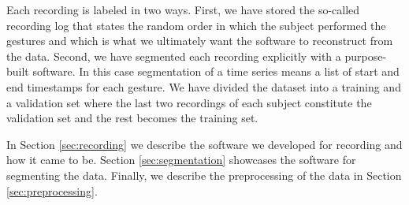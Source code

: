 Each recording is labeled in two ways. First, we have stored the so-called
recording log that states the random order in which the subject performed the
gestures and which is what we ultimately want the software to reconstruct from
the data. Second, we have segmented each recording explicitly with a
purpose-built software. In this case segmentation of a time series means a list
of start and end timestamps for each gesture. We have divided the dataset into a
training and a validation set where the last two recordings of each subject
constitute the validation set and the rest becomes the training set.

In Section \ref{sec:recording} we describe the software we developed for
recording and how it came to be. Section \ref{sec:segmentation} showcases the
software for segmenting the data. Finally, we describe the preprocessing of the
data in Section \ref{sec:preprocessing}.

